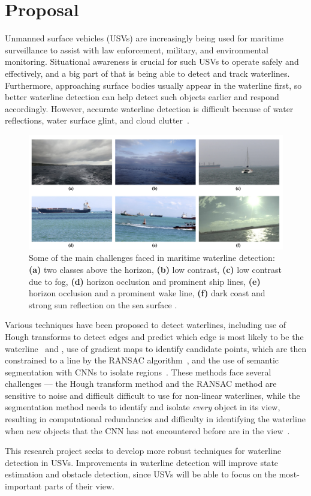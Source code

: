 \section*{Proposal}

Unmanned surface vehicles (USVs) are increasingly being used for maritime surveillance
to assist with law enforcement, military, and environmental monitoring.
Situational awareness is crucial for such USVs to operate safely and effectively,
and a big part of that is being able to detect and track waterlines.
Furthermore, approaching surface bodies usually appear in the waterline first,
so better waterline detection can help detect such objects earlier and
respond accordingly.
However, accurate waterline detection is difficult because of water reflections,
water surface glint, and cloud clutter~\cite{zhan-2017}.

\begin{figure}[h!]
  \includegraphics[width=\textwidth]{challenging-maritime-landscapes.png}
  \caption{
    Some of the main challenges faced in maritime waterline detection:
    \textbf{(a)} two classes above the horizon,
    \textbf{(b)} low contrast,
    \textbf{(c)} low contrast due to fog,
    \textbf{(d)} horizon occlusion and prominent ship lines,
    \textbf{(e)} horizon occlusion and a prominent wake line,
    \textbf{(f)} dark coast and strong sun reflection on the sea surface
    \cite{zardoua-2021}.
  }
\end{figure}
Various techniques have been proposed to detect waterlines,
including use of Hough transforms to detect edges and predict which edge
is most likely to be the waterline~\cite{gao-2007} and \cite{prasad-2017},
use of gradient maps to identify candidate points, which are then constrained
to a line by the \textsc{RANSAC} algorithm~\cite{zhan-2017},
and the use of semantic segmentation with CNNs to isolate regions~\cite{bovcon-2020}.
These methods face several challenges ---
the Hough transform method and the \textsc{RANSAC} method are sensitive to noise
and difficult difficult to use for non-linear waterlines,
while the segmentation method needs to identify and isolate
\emph{every} object in its view, resulting in computational redundancies
and difficulty in identifying the waterline when new objects that the CNN
has not encountered before are in the view~\cite{bovcon-2020}.

\step
This research project seeks to develop more robust techniques for
waterline detection in USVs. Improvements in waterline detection will
improve state estimation and obstacle detection, since USVs will be able to
focus on the most-important parts of their view.
